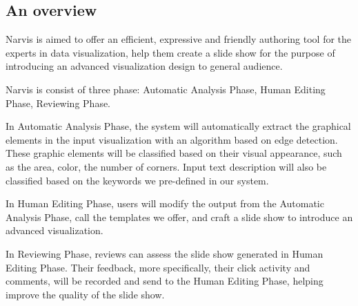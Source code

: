 \documentclass[review,journal]{vgtc}         %
\begin{document}
\subsection{An overview}
Narvis is aimed to offer an efficient, expressive and friendly authoring tool for the experts in data visualization, help them create a slide show for the purpose of introducing an advanced visualization design to general audience.  \par
Narvis is consist of three phase: Automatic Analysis Phase, Human Editing Phase, Reviewing Phase.\par
In Automatic Analysis Phase, the system will automatically extract the graphical elements in the input visualization with an algorithm based on edge detection. These graphic elements will be classified based on their visual appearance, such as the area, color, the number of corners. Input text description will also be classified based on the keywords we pre-defined in our system. \par 
In Human Editing Phase, users will modify the output from the Automatic Analysis Phase, call the templates we offer, and craft a slide show to introduce an advanced visualization. \par 
In Reviewing Phase, reviews can assess the slide show generated in Human Editing Phase. Their feedback, more specifically, their click activity and comments, will be recorded and send to the Human Editing Phase, helping improve the quality of the slide show. 
\end{document}
